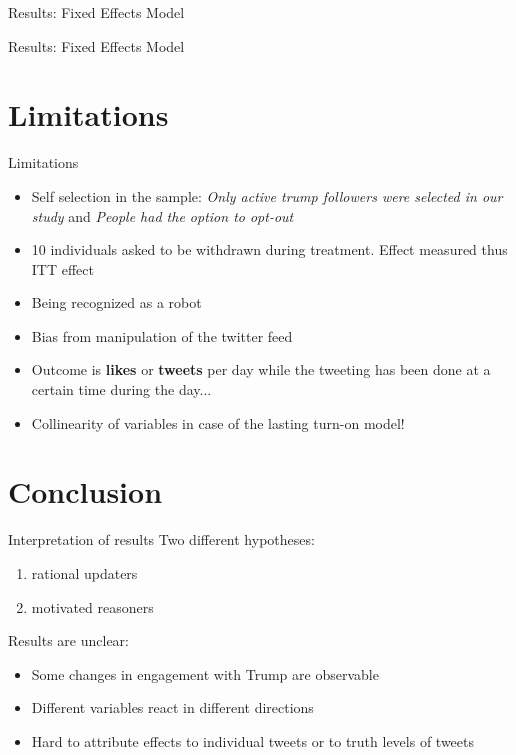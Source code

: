 \documentclass[10pt]{beamer}\usepackage[]{graphicx}\usepackage[]{color}
\begin{document}

\begin{frame}{Results: Fixed Effects Model}

{\tiny

}


\end{frame}

\begin{frame}{Results: Fixed Effects Model}

{\tiny

}


\end{frame}


\section{Limitations}
\begin{frame}{Limitations}
\begin{itemize}

\item Self selection in the sample: 
\textit{Only active trump followers were selected in our study} and \textit{People had the option to opt-out}
	\item 10 individuals asked to be withdrawn during treatment. Effect measured thus ITT effect
\item Being recognized as a robot
\item Bias from manipulation of the twitter feed
\item Outcome is \textbf{likes} or \textbf{tweets} per day while the tweeting has been done at a certain time during the day...
\item Collinearity of variables in case of the lasting turn-on model!
\end{itemize}
\end{frame}




\section{Conclusion}

\begin{frame}{Interpretation of results}
Two different hypotheses:
\begin{enumerate}
  \item rational updaters
  \item motivated reasoners
\end{enumerate}

Results are unclear:
\begin{itemize}
  \item Some changes in engagement with Trump are observable
  \item Different variables react in different directions
  \item Hard to attribute effects to individual tweets or to truth levels of tweets
\end{itemize}

\end{frame}
\end{document}
